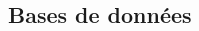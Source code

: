 \documentclass[10pt,fleqn]{article} %
\begin{document}
%

%

%
%
%

%

%
%
%

\begin{multicols}{2}
\section{Bases de données}

\end{multicols}
\newpage

%
%
\end{document}
